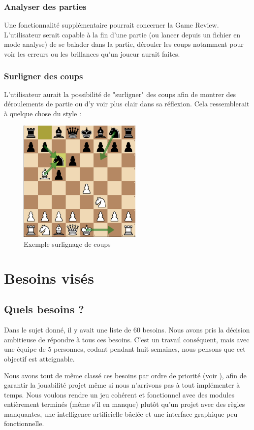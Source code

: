 \documentclass{article}
\begin{document}
\subsubsection{Analyser des parties}
Une fonctionnalité supplémentaire pourrait concerner la Game Review. L'utilisateur serait capable à la fin d'une partie (ou lancer depuis un fichier en mode 
analyse) de se balader dans la partie, dérouler les coups notamment pour voir les erreurs ou les brillances qu'un joueur aurait faites.

\subsubsection{Surligner des coups}
L'utilisateur aurait la possibilité de "surligner" des coups afin de montrer des déroulements de partie ou d'y voir plus clair dans sa réflexion.
Cela ressemblerait à quelque chose du style :\\
\begin{figure}[h]
    \caption{Exemple surlignage de coups}
    \centering
    \includegraphics[width=\textwidth,height=6.0cm,keepaspectratio]{surlignage-coups}
\end{figure}

\section{Besoins visés}
\subsection{Quels besoins ?}
Dans le sujet donné, il y avait une liste de 60 besoins.
Nous avons pris la décision ambitieuse de répondre à tous ces besoins. C'est un travail conséquent,
mais avec une équipe de 5 personnes, codant pendant huit semaines,
nous pensons que cet objectif est atteignable.

Nous avons tout de même classé ces besoins par ordre de priorité (voir ), afin de garantir
la jouabilité projet même si nous n'arrivons pas à tout implémenter à temps.
Nous voulons rendre un jeu cohérent et fonctionnel avec des modules entièrement
terminés (même s'il en manque) plutôt qu'un projet avec des règles manquantes,
une intelligence artificielle bâclée et une interface graphique peu fonctionnelle.
\end{document}
